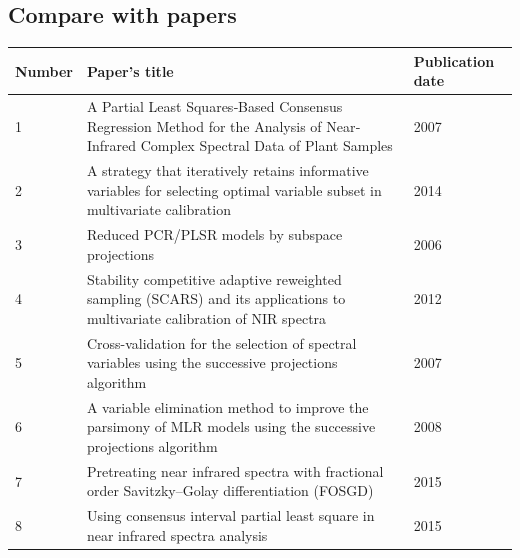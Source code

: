 \documentclass[a4paper,12pt,titlepage]{article} %
\numberwithin{equation}{section}  %
\begin{document}
	\subsection{Compare with papers}
	\label{sec:Compare with papers}
	

	
	\begin{landscape}
		
\begin{table}[]
	\begin{tabular}{lll}
		\hline
		Number & Paper's title & Publication date \\ \hline
		1 & A Partial Least Squares‐Based Consensus Regression Method for the Analysis of Near‐Infrared Complex Spectral Data of Plant Samples & 2007 \\
		2 & A strategy that iteratively retains informative variables for selecting optimal variable subset in multivariate calibration & 2014 \\
		3 & Reduced PCR/PLSR models by subspace projections & 2006 \\
		4 & Stability competitive adaptive reweighted sampling (SCARS) and its applications to multivariate calibration of NIR spectra & 2012 \\
		5 & Cross-validation for the selection of spectral variables using the successive projections algorithm & 2007 \\
		6 & A variable elimination method to improve the parsimony of MLR models using the successive projections algorithm & 2008 \\
		7 & Pretreating near infrared spectra with fractional order Savitzky–Golay differentiation (FOSGD) & 2015 \\
		8 & Using consensus interval partial least square in near infrared spectra analysis & 2015
	\end{tabular}

\label{tab:papers}
\end{table}


\end{landscape}
\end{document}

